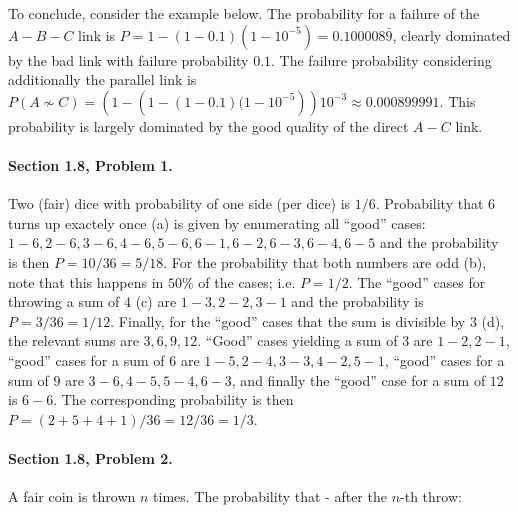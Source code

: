 To conclude, consider the example below. The probability for a failure of the $A-B-C$ link is $P = 1 - (1-0.1)(1-10^{-5}) = 0.100008\bar{9}$, clearly dominated by the bad link with failure probability $0.1$. The failure probability considering additionally the parallel link is $P(A \not\sim C) = \left(1 - \left(1 - (1-0.1)(1-10^{-5}\right)\right)10^{-3}\approx 0.000899991$. This probability is largely dominated by the good quality of the direct $A-C$ link.

\vspace{0.5cm}

\SetVertexNormal[Shape = circle, FillColor = orange, LineWidth = 2pt] \SetUpEdge[lw = 1.5pt, color = black, labelcolor = white, labeltext = red, labelstyle = {sloped,draw,text=blue}]



\paragraph{Section 1.8, Problem 1.} Two (fair) dice with probability of one side (per dice) is $1/6$. Probability that $6$ turns up exactely once (a) is given by enumerating all ``good'' cases: $1-6, 2-6, 3-6, 4-6, 5-6, 6-1, 6-2, 6-3, 6-4, 6-5$ and the probability is then $P = 10/36 = 5/18$. For the probability that both numbers are odd (b), note that this happens in $50\%$ of the cases; i.e. $P = 1/2$. The ``good'' cases for throwing a sum of $4$ (c) are $1-3, 2-2, 3-1$ and the probability is $P = 3/36 = 1/12$. Finally, for the ``good'' cases that the sum is divisible by $3$ (d), the relevant sums are $3,6,9,12$. ``Good'' cases yielding a sum of $3$ are $1-2, 2-1$, ``good'' cases for a sum of $6$ are $1-5, 2-4, 3-3, 4-2, 5-1$, ``good'' cases for a sum of $9$ are $3-6, 4-5, 5-4, 6-3$, and finally the ``good'' case for a sum of $12$ is $6-6$. The corresponding probability is then $P = (2 + 5 + 4 + 1)/36 = 12/36 = 1/3$.

\paragraph{Section 1.8, Problem 2.} A fair coin is thrown $n$ times. The probability that - after the $n$-th throw:

